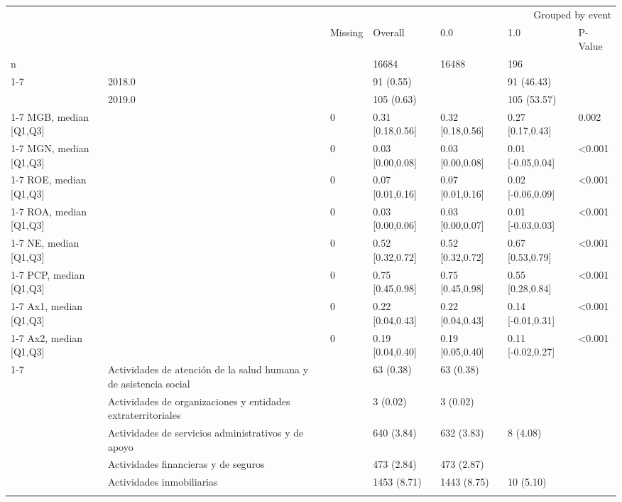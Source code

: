 \begin{tabular}{lllllll}
\toprule
 &  & \multicolumn{5}{r}{Grouped by event} \\
 &  & Missing & Overall & 0.0 & 1.0 & P-Value \\
\midrule
n &  &  & 16684 & 16488 & 196 &  \\
\cline{1-7}
\multirow[t]{3}{*}{time-event, n (%
 & 2018.0 &  & 91 (0.55) &  & 91 (46.43) &  \\
 & 2019.0 &  & 105 (0.63) &  & 105 (53.57) &  \\
\cline{1-7}
MGB, median [Q1,Q3] &  & 0 & 0.31 [0.18,0.56] & 0.32 [0.18,0.56] & 0.27 [0.17,0.43] & 0.002 \\
\cline{1-7}
MGN, median [Q1,Q3] &  & 0 & 0.03 [0.00,0.08] & 0.03 [0.00,0.08] & 0.01 [-0.05,0.04] & <0.001 \\
\cline{1-7}
ROE, median [Q1,Q3] &  & 0 & 0.07 [0.01,0.16] & 0.07 [0.01,0.16] & 0.02 [-0.06,0.09] & <0.001 \\
\cline{1-7}
ROA, median [Q1,Q3] &  & 0 & 0.03 [0.00,0.06] & 0.03 [0.00,0.07] & 0.01 [-0.03,0.03] & <0.001 \\
\cline{1-7}
NE, median [Q1,Q3] &  & 0 & 0.52 [0.32,0.72] & 0.52 [0.32,0.72] & 0.67 [0.53,0.79] & <0.001 \\
\cline{1-7}
PCP, median [Q1,Q3] &  & 0 & 0.75 [0.45,0.98] & 0.75 [0.45,0.98] & 0.55 [0.28,0.84] & <0.001 \\
\cline{1-7}
Ax1, median [Q1,Q3] &  & 0 & 0.22 [0.04,0.43] & 0.22 [0.04,0.43] & 0.14 [-0.01,0.31] & <0.001 \\
\cline{1-7}
Ax2, median [Q1,Q3] &  & 0 & 0.19 [0.04,0.40] & 0.19 [0.05,0.40] & 0.11 [-0.02,0.27] & <0.001 \\
\cline{1-7}
\multirow[t]{20}{*}{Sector, n (%
 & Actividades de atención de la salud humana y de asistencia social &  & 63 (0.38) & 63 (0.38) &  &  \\
 & Actividades de organizaciones y entidades extraterritoriales &  & 3 (0.02) & 3 (0.02) &  &  \\
 & Actividades de servicios administrativos y de apoyo &  & 640 (3.84) & 632 (3.83) & 8 (4.08) &  \\
 & Actividades financieras y de seguros &  & 473 (2.84) & 473 (2.87) &  &  \\
 & Actividades inmobiliarias &  & 1453 (8.71) & 1443 (8.75) & 10 (5.10) &  \\
}}
\end{tabular}
